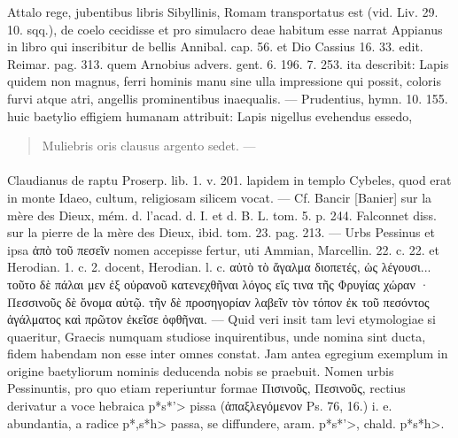 \documentclass[a4paper, 11pt, oneside, polutonikogreek, german]{article}
\begin{document}
Attalo rege, jubentibus libris Sibyllinis, Romam transportatus est (vid. Liv. 29. 10. sqq.), de coelo cecidisse et pro simulacro deae habitum esse narrat Appianus in libro qui inscribitur de bellis Annibal. cap. 56. et Dio Cassius 16. 33. edit. Reimar. pag. 313. quem Arnobius advers. gent. 6. 196. 7. 253. ita describit: Lapis quidem non magnus, ferri hominis manu sine ulla impressione qui possit, coloris furvi atque atri, angellis prominentibus inaequalis. --- Prudentius, hymn. 10. 155. huic baetylio effigiem humanam attribuit: Lapis nigellus evehendus essedo,
\begin{quotation}
Muliebris oris clausus argento sedet. ---
\end{quotation}
\paragraph{}
Claudianus de raptu Proserp. lib. 1. v. 201. lapidem in templo Cybeles, quod erat in monte Idaeo, cultum, religiosam silicem vocat. --- Cf. Bancir [Banier] sur la mère des Dieux, mém. d. l'acad. d. I. et d. B. L. tom. 5. p. 244. Falconnet diss. sur la pierre de la mère des Dieux, ibid. tom. 23. pag. 213. --- Urbs Pessinus et ipsa ἀπὸ τοῦ πεσεῖν nomen accepisse fertur, uti Ammian, Marcellin. 22. c. 22. et Herodian. 1. c. 2. docent, Herodian. l. c. αὐτὸ τὸ ἄγαλμα διοπετές, ὡς λέγουσι... τοῦτο δὲ πάλαι μεν ἐξ οὐρανοῦ κατενεχθῆναι λόγος εἴς τινα τῆς Φρυγίας χώραν · Πεσσινοῦς δὲ ὄνομα αὐτῷ. τῆν δὲ προσηγορίαν λαβεῖν τὸν τόπον ἐκ τοῦ πεσόντος ἀγάλματος καὶ πρῶτον ἐκεῖσε ὀφθῆναι. --- Quid veri insit tam levi etymologiae si quaeritur, Graecis numquam studiose inquirentibus, unde nomina sint ducta, fidem habendam non esse inter omnes constat. Jam antea egregium exemplum in origine baetyliorum nominis deducenda nobis se praebuit. Nomen urbis Pessinuntis, pro quo etiam reperiuntur formae Πισινοῦς, Πεσινοῦς, rectius derivatur a voce hebraica \<p*s*'> pissa (ἁπαξλεγόμενον Ps. 76, 16.) i. e. abundantia, a radice \<p*,s*h> passa, se diffundere, aram. \<p*s*'>, chald. \<p*s*h>.
\end{document}
